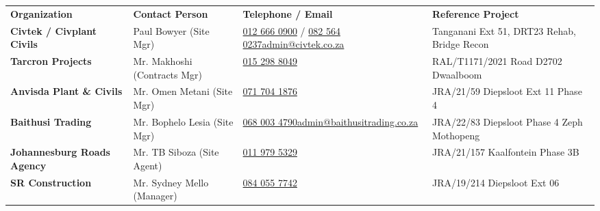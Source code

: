 \renewcommand{\arraystretch}{1.28}
\begin{tabularx}{\textwidth}{@{}
    >{\raggedright\arraybackslash}p{3.5cm} 
    >{\raggedright\arraybackslash}p{3.1cm} 
    >{\raggedright\arraybackslash}p{4.2cm} 
    >{\raggedright\arraybackslash}X
@{}}
\rowcolor{mhnavy}
{\color{white}\bfseries\fontsize{8pt}{9.8pt}\selectfont Organization} &
{\color{white}\bfseries\fontsize{8pt}{9.8pt}\selectfont Contact Person} &
{\color{white}\bfseries\fontsize{8pt}{9.8pt}\selectfont Telephone / Email} &
{\color{white}\bfseries\fontsize{8pt}{9.8pt}\selectfont Reference Project} \\
\rowcolor{mhbluelight}
\fontsize{7.6pt}{9.4pt}\selectfont\bfseries Civtek / Civplant Civils & \fontsize{7.6pt}{9.4pt}\selectfont Paul Bowyer (Site Mgr) & \fontsize{7.6pt}{9.4pt}\selectfont \href{tel:0126660900}{012 666 0900} / \href{tel:0825640237}{082 564 0237}\newline\href{mailto:admin@civtek.co.za}{admin@civtek.co.za} & \fontsize{7.6pt}{9.4pt}\selectfont Tanganani Ext 51, DRT23 Rehab, Bridge Recon \\
\fontsize{7.6pt}{9.4pt}\selectfont\bfseries Tarcron Projects & \fontsize{7.6pt}{9.4pt}\selectfont Mr. Makhoshi (Contracts Mgr) & \fontsize{7.6pt}{9.4pt}\selectfont \href{tel:0152988049}{015 298 8049} & \fontsize{7.6pt}{9.4pt}\selectfont RAL/T1171/2021 Road D2702 Dwaalboom \\
\rowcolor{mhbluelight}
\fontsize{7.6pt}{9.4pt}\selectfont\bfseries Anvisda Plant \& Civils & \fontsize{7.6pt}{9.4pt}\selectfont Mr. Omen Metani (Site Mgr) & \fontsize{7.6pt}{9.4pt}\selectfont \href{tel:0717041876}{071 704 1876} & \fontsize{7.6pt}{9.4pt}\selectfont JRA/21/59 Diepsloot Ext 11 Phase 4 \\
\fontsize{7.6pt}{9.4pt}\selectfont\bfseries Baithusi Trading & \fontsize{7.6pt}{9.4pt}\selectfont Mr. Bophelo Lesia (Site Mgr) & \fontsize{7.6pt}{9.4pt}\selectfont \href{tel:0680034790}{068 003 4790}\newline\href{mailto:admin@baithusitrading.co.za}{admin@baithusitrading.co.za} & \fontsize{7.6pt}{9.4pt}\selectfont JRA/22/83 Diepsloot Phase 4 Zeph Mothopeng \\
\rowcolor{mhbluelight}
\fontsize{7.6pt}{9.4pt}\selectfont\bfseries Johannesburg Roads Agency & \fontsize{7.6pt}{9.4pt}\selectfont Mr. TB Siboza (Site Agent) & \fontsize{7.6pt}{9.4pt}\selectfont \href{tel:0119795329}{011 979 5329} & \fontsize{7.6pt}{9.4pt}\selectfont JRA/21/157 Kaalfontein Phase 3B \\
\fontsize{7.6pt}{9.4pt}\selectfont\bfseries SR Construction & \fontsize{7.6pt}{9.4pt}\selectfont Mr. Sydney Mello (Manager) & \fontsize{7.6pt}{9.4pt}\selectfont \href{tel:0840557742}{084 055 7742} & \fontsize{7.6pt}{9.4pt}\selectfont JRA/19/214 Diepsloot Ext 06 \\

\end{tabularx}

